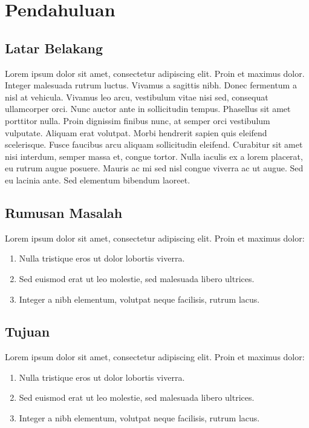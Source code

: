 \chapter{Pendahuluan}

\section{Latar Belakang}

Lorem ipsum dolor sit amet, consectetur adipiscing elit. Proin et maximus dolor. Integer malesuada rutrum luctus. Vivamus a sagittis nibh. Donec fermentum a nisl at vehicula. Vivamus leo arcu, vestibulum vitae nisi sed, consequat ullamcorper orci. Nunc auctor ante in sollicitudin tempus. Phasellus sit amet porttitor nulla. Proin dignissim finibus nunc, at semper orci vestibulum vulputate. Aliquam erat volutpat. Morbi hendrerit sapien quis eleifend scelerisque. Fusce faucibus arcu aliquam sollicitudin eleifend. Curabitur sit amet nisi interdum, semper massa et, congue tortor. Nulla iaculis ex a lorem placerat, eu rutrum augue posuere. Mauris ac mi sed nisl congue viverra ac ut augue. Sed eu lacinia ante. Sed elementum bibendum laoreet.

\section{Rumusan Masalah}

Lorem ipsum dolor sit amet, consectetur adipiscing elit. Proin et maximus dolor: 
\begin{enumerate}
    \item Nulla tristique eros ut dolor lobortis viverra.
    \item Sed euismod erat ut leo molestie, sed malesuada libero ultrices.
    \item Integer a nibh elementum, volutpat neque facilisis, rutrum lacus.
\end{enumerate}

\section{Tujuan}

Lorem ipsum dolor sit amet, consectetur adipiscing elit. Proin et maximus dolor: 
\begin{enumerate}
    \item Nulla tristique eros ut dolor lobortis viverra.
    \item Sed euismod erat ut leo molestie, sed malesuada libero ultrices.
    \item Integer a nibh elementum, volutpat neque facilisis, rutrum lacus.
\end{enumerate}

